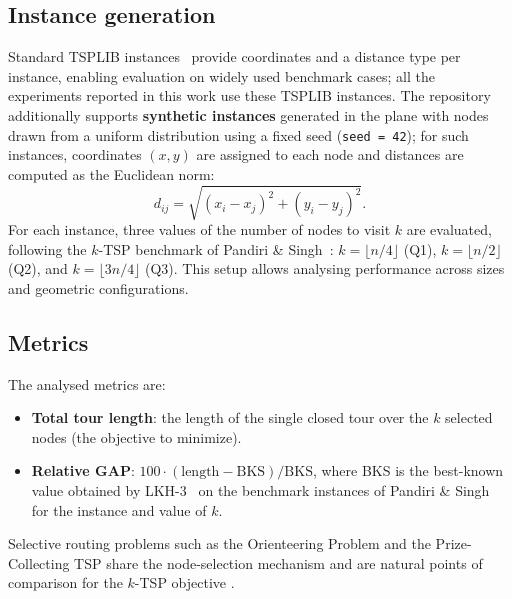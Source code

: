 \documentclass[conference]{IEEEtran}
\begin{document}
\subsection*{Instance generation}
Standard TSPLIB instances~\cite{TSPLIB} provide coordinates and a distance type per instance, enabling evaluation on widely used benchmark cases; all the experiments reported in this work use these TSPLIB instances. The repository additionally supports \textbf{synthetic instances} generated in the plane with nodes drawn from a uniform distribution using a fixed seed (\texttt{seed = 42}); for such instances, coordinates $(x,y)$ are assigned to each node and distances are computed as the Euclidean norm:
\[
  d_{ij}=\sqrt{(x_i-x_j)^2+(y_i-y_j)^2}.
\]
For each instance, three values of the number of nodes to visit $k$ are evaluated, following the $k$-TSP benchmark of Pandiri \& Singh~\cite{pandiri2020}: $k=\lfloor n/4\rfloor$ (Q1), $k=\lfloor n/2\rfloor$ (Q2), and $k=\lfloor 3n/4\rfloor$ (Q3). This setup allows analysing performance across sizes and geometric configurations.

\subsection*{Metrics}
The analysed metrics are:
\begin{itemize}
    \item \textbf{Total tour length}: the length of the single closed tour over the $k$ selected nodes (the objective to minimize).
    \item \textbf{Relative GAP}: $100\cdot(\text{length}-\text{BKS})/\text{BKS}$, where BKS is the best-known value obtained by LKH-3~\cite{Helsgaun} on the benchmark instances of Pandiri \& Singh~\cite{pandiri2020} for the instance and value of $k$.
\end{itemize}
Selective routing problems such as the Orienteering Problem and the Prize-Collecting TSP share the node-selection mechanism and are natural points of comparison for the $k$-TSP objective \cite{vansteenwegen2011top}.

\end{document}
